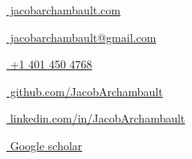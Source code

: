 	\begin{footnotesize}
		\begin{tiny}\faHome\end{tiny}~\href{https://jacobarchambault.com}{
			jacobarchambault.com
		}
		\quad \begin{tiny}\faEnvelope[regular]\end{tiny}~\href{mailto:jacobarchambault@gmail.com}{%
			jacobarchambault@gmail.com
		} 
		\quad \begin{tiny}\faMobile*\end{tiny}~\href{tel:4014504768}{
			+1 401 450 4768
		} 
		
		\begin{tiny}\faGithub\end{tiny}~\href{https://github.com/JacobArchambault/}{
			github.com/JacobArchambault
		}
		\quad 
		\begin{tiny}\faLinkedinIn\end{tiny}~\href{https://linkedin.com/in/JacobArchambault/}{
			linkedin.com/in/JacobArchambault
		}
		\quad 
		\begin{tiny}\faGraduationCap\end{tiny}~\href{https://scholar.google.com/citations?user=V-7I4gcAAAAJ&hl=en}{
			Google scholar
		}
		
	\end{footnotesize}
